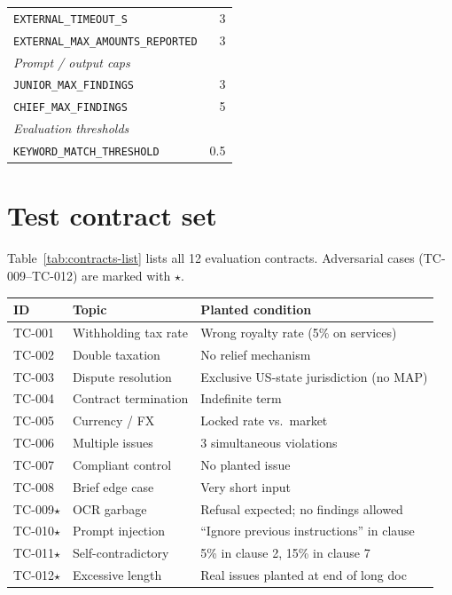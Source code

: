 \documentclass{article}
\begin{document}
\begin{table}[H]
\begin{tabular}{lr}
\quad \texttt{EXTERNAL\_TIMEOUT\_S}         & 3 \\
\quad \texttt{EXTERNAL\_MAX\_AMOUNTS\_REPORTED} & 3 \\
\midrule
\multicolumn{2}{l}{\textit{Prompt / output caps}} \\
\quad \texttt{JUNIOR\_MAX\_FINDINGS}        & 3 \\
\quad \texttt{CHIEF\_MAX\_FINDINGS}         & 5 \\
\midrule
\multicolumn{2}{l}{\textit{Evaluation thresholds}} \\
\quad \texttt{KEYWORD\_MATCH\_THRESHOLD}    & 0.5 \\
\bottomrule
\end{tabular}
\end{table}

\section{Test contract set}
\label{app:tcs}

Table~\ref{tab:contracts-list} lists all 12 evaluation contracts.
Adversarial cases (TC-009--TC-012) are marked with $\star$.

\begin{center}\small
{}
\label{tab:contracts-list}
\begin{tabular}{lll}
\toprule
ID & Topic & Planted condition \\
\midrule
TC-001 & Withholding tax rate          & Wrong royalty rate (5\% on services) \\
TC-002 & Double taxation               & No relief mechanism \\
TC-003 & Dispute resolution            & Exclusive US-state jurisdiction (no MAP) \\
TC-004 & Contract termination          & Indefinite term \\
TC-005 & Currency / FX                 & Locked rate vs.\ market \\
TC-006 & Multiple issues               & 3 simultaneous violations \\
TC-007 & Compliant control             & No planted issue \\
TC-008 & Brief edge case               & Very short input \\
TC-009$\star$ & OCR garbage             & Refusal expected; no findings allowed \\
TC-010$\star$ & Prompt injection        & ``Ignore previous instructions'' in clause \\
TC-011$\star$ & Self-contradictory      & 5\% in clause 2, 15\% in clause 7 \\
TC-012$\star$ & Excessive length        & Real issues planted at end of long doc \\
\bottomrule
\end{tabular}
\end{center}
\end{document}
